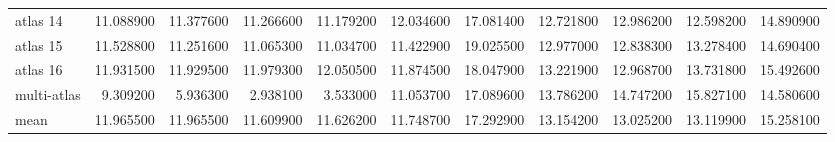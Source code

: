 \documentclass[a4paper]{article}
\begin{document}
\begin{landscape}
\begin{tabular}{lrrrrrrrrrr}
atlas 14 & 11.088900 & 11.377600 & 11.266600 & 11.179200 & 12.034600 & 17.081400 & 12.721800 & 12.986200 & 12.598200 & 14.890900 \\
atlas 15 & 11.528800 & 11.251600 & 11.065300 & 11.034700 & 11.422900 & 19.025500 & 12.977000 & 12.838300 & 13.278400 & 14.690400 \\
atlas 16 & 11.931500 & 11.929500 & 11.979300 & 12.050500 & 11.874500 & 18.047900 & 13.221900 & 12.968700 & 13.731800 & 15.492600 \\
multi-atlas & 9.309200 & 5.936300 & 2.938100 & 3.533000 & 11.053700 & 17.089600 & 13.786200 & 14.747200 & 15.827100 & 14.580600 \\
mean & 11.965500 & 11.965500 & 11.609900 & 11.626200 & 11.748700 & 17.292900 & 13.154200 & 13.025200 & 13.119900 & 15.258100 \\
\bottomrule
\end{tabular}

\end{landscape}
\end{document}
